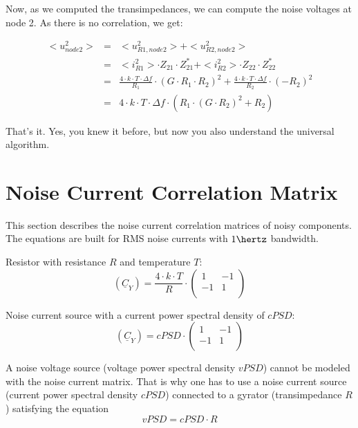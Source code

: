 Now, as we computed the transimpedances, we can
compute the noise voltages at node 2. As there is
no correlation, we get:

\begin{eqnarray}
<u_{node2}^2> & = & <u_{R1,node2}^2> + <u_{R2,node2}^2> \\
  & = & <i_{R1}^2>\cdot Z_{21}\cdot Z_{21}^* + <i_{R2}^2>\cdot Z_{22}\cdot Z_{22}^* \\
  & = & \frac{4\cdot k\cdot T\cdot \Delta f}{R_1} \cdot (G\cdot R_1\cdot R_2)^2 +
        \frac{4\cdot k\cdot T\cdot \Delta f}{R_2} \cdot (-R_2)^2 \\
  & = & 4\cdot k\cdot T\cdot \Delta f\cdot \left( R_1\cdot (G\cdot R_2)^2 + R_2 \right)
\end{eqnarray}

That's it. Yes, you knew it before, but now you also understand
the universal algorithm.



\section{Noise Current Correlation Matrix}

This section describes the noise current correlation matrices of noisy
components.  The equations are built for RMS noise currents with
$1\hertz$ bandwidth.

\addvspace{12pt}

Resistor with resistance $R$ and temperature $T$:
\begin{equation}
(\underline{C}_Y) = \frac{4\cdot k\cdot T}{R} \cdot
\begin{pmatrix}
 1 & -1 \\
-1 &  1 \\
\end{pmatrix}
\end{equation}

Noise current source with a current power spectral density of $cPSD$:
\begin{equation}
(\underline{C}_Y) = cPSD \cdot
\begin{pmatrix}
 1 & -1 \\
-1 &  1 \\
\end{pmatrix}
\end{equation}

A noise voltage source (voltage power spectral density $vPSD$)
cannot be modeled with the noise current
matrix. That is why one has to use a noise current source
(current power spectral density $cPSD$) connected to a gyrator
(transimpedance $R$) satisfying the equation
\begin{equation}
vPSD = cPSD \cdot R
\end{equation}

